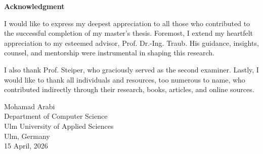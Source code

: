 
\cleardoublepage
\newpage
\thispagestyle{empty}
{}

\begin{center}\huge \textbf{Acknowledgment}\end{center}

I would like to express my deepest appreciation to all those who contributed to the
successful completion of my master's thesis. Foremost, I extend my heartfelt
appreciation to my esteemed advisor, Prof. Dr.-Ing. Traub. His guidance, insights,
counsel, and mentorship were instrumental in shaping this research.

I also thank Prof. Steiper, who graciously served as the second examiner.
Lastly, I would like to thank all individuals and resources, too numerous to name,
who contributed indirectly through their research, books, articles, and online sources.

\vfill
\begin{flushright}
\large
Mohamad Arabi\\
Department of Computer Science\\
Ulm University of Applied Sciences\\
Ulm, Germany\\
15 April, 2026
\end{flushright}
